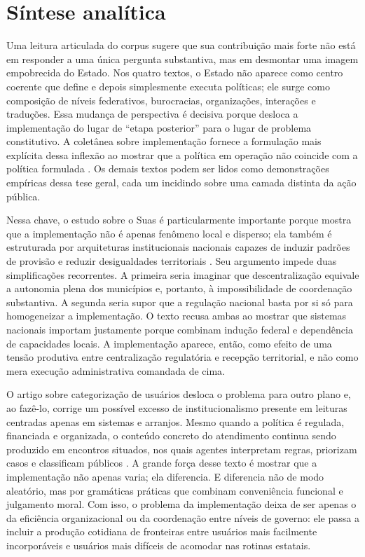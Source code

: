 \documentclass[12pt,a4paper]{article}
\begin{document}
\section{Síntese analítica}
\label{sec:org6a1d584}

Uma leitura articulada do corpus sugere que sua contribuição mais forte não está em responder a uma única pergunta substantiva, mas em desmontar uma imagem empobrecida do Estado. Nos quatro textos, o Estado não aparece como centro coerente que define e depois simplesmente executa políticas; ele surge como composição de níveis federativos, burocracias, organizações, interações e traduções. Essa mudança de perspectiva é decisiva porque desloca a implementação do lugar de “etapa posterior” para o lugar de problema constitutivo. A coletânea sobre implementação fornece a formulação mais explícita dessa inflexão ao mostrar que a política em operação não coincide com a política formulada \parencite{lotta2019_teorias_analises}. Os demais textos podem ser lidos como demonstrações empíricas dessa tese geral, cada um incidindo sobre uma camada distinta da ação pública.

Nessa chave, o estudo sobre o Suas é particularmente importante porque mostra que a implementação não é apenas fenômeno local e disperso; ela também é estruturada por arquiteturas institucionais nacionais capazes de induzir padrões de provisão e reduzir desigualdades territoriais \parencite{bichir2020_sistemas_nacionais}. Seu argumento impede duas simplificações recorrentes. A primeira seria imaginar que descentralização equivale a autonomia plena dos municípios e, portanto, à impossibilidade de coordenação substantiva. A segunda seria supor que a regulação nacional basta por si só para homogeneizar a implementação. O texto recusa ambas ao mostrar que sistemas nacionais importam justamente porque combinam indução federal e dependência de capacidades locais. A implementação aparece, então, como efeito de uma tensão produtiva entre centralização regulatória e recepção territorial, e não como mera execução administrativa comandada de cima.

O artigo sobre categorização de usuários desloca o problema para outro plano e, ao fazê-lo, corrige um possível excesso de institucionalismo presente em leituras centradas apenas em sistemas e arranjos. Mesmo quando a política é regulada, financiada e organizada, o conteúdo concreto do atendimento continua sendo produzido em encontros situados, nos quais agentes interpretam regras, priorizam casos e classificam públicos \parencite{lotta2020_categorizando_usuarios}. A grande força desse texto é mostrar que a implementação não apenas varia; ela diferencia. E diferencia não de modo aleatório, mas por gramáticas práticas que combinam conveniência funcional e julgamento moral. Com isso, o problema da implementação deixa de ser apenas o da eficiência organizacional ou da coordenação entre níveis de governo: ele passa a incluir a produção cotidiana de fronteiras entre usuários mais facilmente incorporáveis e usuários mais difíceis de acomodar nas rotinas estatais.
\end{document}
